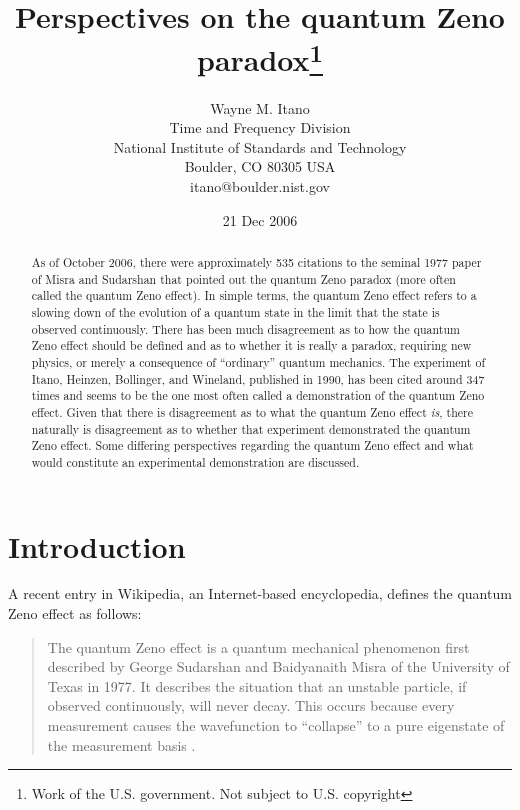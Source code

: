 \documentclass[12pt]{article}
\begin{document}
\title{Perspectives on the quantum Zeno paradox\footnote{Work of the U.S. government.  Not subject to U.S. copyright}}
\author{Wayne M. Itano\\
Time and Frequency Division\\ National Institute of Standards and Technology\\ Boulder, CO 80305 USA\\ itano@boulder.nist.gov}
\date{21 Dec 2006}
\maketitle



\begin{abstract}
As of October 2006, there were approximately 535 citations to the
seminal 1977 paper of Misra and Sudarshan that pointed out the
quantum Zeno paradox (more often called the quantum Zeno effect). In
simple terms, the quantum Zeno effect refers to a slowing down of
the evolution of a quantum state in the limit that the state is
observed continuously. There has been much disagreement as to how
the quantum Zeno effect should be defined and as to whether it is
really a paradox, requiring new physics, or merely a consequence of
``ordinary'' quantum mechanics.  The experiment of Itano, Heinzen,
Bollinger, and Wineland, published in 1990, has been cited around
347 times and seems to be the one most often called a demonstration
of the quantum Zeno effect. Given that there is disagreement as to
what the quantum Zeno effect {\em is}, there naturally is
disagreement as to whether that experiment demonstrated the quantum
Zeno effect. Some differing perspectives regarding the quantum Zeno
effect and what would constitute an experimental demonstration are
discussed.

\end{abstract}

\newpage
\section{Introduction}

A recent entry in  Wikipedia, an Internet-based encyclopedia,
defines the quantum Zeno effect as follows:

\begin{quote}The quantum Zeno effect is a quantum mechanical phenomenon
first described by George Sudarshan and Baidyanaith Misra of the
University of Texas in 1977. It describes the situation that an
unstable particle, if observed continuously, will never decay. This
occurs because every measurement causes the wavefunction to
``collapse'' to a pure eigenstate of the measurement basis
\cite{wiki}.
\end{quote}
\end{document}
